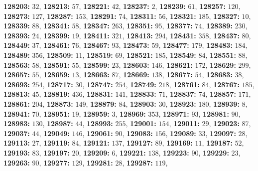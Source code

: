\textsf{\bfseries 128203:} $32$, \textsf{\bfseries 128213:} $57$, \textsf{\bfseries 128221:} $42$, \textsf{\bfseries 128237:} $2$, \textsf{\bfseries 128239:} $61$, \textsf{\bfseries 128257:} $120$, \textsf{\bfseries 128273:} $127$, \textsf{\bfseries 128287:} $153$, \textsf{\bfseries 128291:} $74$, \textsf{\bfseries 128311:} $56$, \textsf{\bfseries 128321:} $185$, \textsf{\bfseries 128327:} $10$, \textsf{\bfseries 128339:} $88$, \textsf{\bfseries 128341:} $58$, \textsf{\bfseries 128347:} $263$, \textsf{\bfseries 128351:} $95$, \textsf{\bfseries 128377:} $74$, \textsf{\bfseries 128389:} $230$, \textsf{\bfseries 128393:} $24$, \textsf{\bfseries 128399:} $19$, \textsf{\bfseries 128411:} $321$, \textsf{\bfseries 128413:} $294$, \textsf{\bfseries 128431:} $358$, \textsf{\bfseries 128437:} $80$, \textsf{\bfseries 128449:} $37$, \textsf{\bfseries 128461:} $76$, \textsf{\bfseries 128467:} $93$, \textsf{\bfseries 128473:} $59$, \textsf{\bfseries 128477:} $179$, \textsf{\bfseries 128483:} $184$, \textsf{\bfseries 128489:} $356$, \textsf{\bfseries 128509:} $11$, \textsf{\bfseries 128519:} $69$, \textsf{\bfseries 128521:} $185$, \textsf{\bfseries 128549:} $84$, \textsf{\bfseries 128551:} $88$, \textsf{\bfseries 128563:} $58$, \textsf{\bfseries 128591:} $55$, \textsf{\bfseries 128599:} $23$, \textsf{\bfseries 128603:} $146$, \textsf{\bfseries 128621:} $172$, \textsf{\bfseries 128629:} $299$, \textsf{\bfseries 128657:} $55$, \textsf{\bfseries 128659:} $13$, \textsf{\bfseries 128663:} $87$, \textsf{\bfseries 128669:} $138$, \textsf{\bfseries 128677:} $54$, \textsf{\bfseries 128683:} $38$, \textsf{\bfseries 128693:} $254$, \textsf{\bfseries 128717:} $30$, \textsf{\bfseries 128747:} $254$, \textsf{\bfseries 128749:} $218$, \textsf{\bfseries 128761:} $84$, \textsf{\bfseries 128767:} $185$, \textsf{\bfseries 128813:} $45$, \textsf{\bfseries 128819:} $436$, \textsf{\bfseries 128831:} $141$, \textsf{\bfseries 128833:} $71$, \textsf{\bfseries 128837:} $74$, \textsf{\bfseries 128857:} $171$, \textsf{\bfseries 128861:} $204$, \textsf{\bfseries 128873:} $149$, \textsf{\bfseries 128879:} $84$, \textsf{\bfseries 128903:} $30$, \textsf{\bfseries 128923:} $180$, \textsf{\bfseries 128939:} $8$, \textsf{\bfseries 128941:} $70$, \textsf{\bfseries 128951:} $19$, \textsf{\bfseries 128959:} $3$, \textsf{\bfseries 128969:} $353$, \textsf{\bfseries 128971:} $93$, \textsf{\bfseries 128981:} $90$, \textsf{\bfseries 128983:} $130$, \textsf{\bfseries 128987:} $44$, \textsf{\bfseries 128993:} $255$, \textsf{\bfseries 129001:} $154$, \textsf{\bfseries 129011:} $29$, \textsf{\bfseries 129023:} $87$, \textsf{\bfseries 129037:} $44$, \textsf{\bfseries 129049:} $146$, \textsf{\bfseries 129061:} $90$, \textsf{\bfseries 129083:} $156$, \textsf{\bfseries 129089:} $33$, \textsf{\bfseries 129097:} $28$, \textsf{\bfseries 129113:} $27$, \textsf{\bfseries 129119:} $84$, \textsf{\bfseries 129121:} $137$, \textsf{\bfseries 129127:} $89$, \textsf{\bfseries 129169:} $11$, \textsf{\bfseries 129187:} $52$, \textsf{\bfseries 129193:} $83$, \textsf{\bfseries 129197:} $20$, \textsf{\bfseries 129209:} $6$, \textsf{\bfseries 129221:} $138$, \textsf{\bfseries 129223:} $90$, \textsf{\bfseries 129229:} $23$, \textsf{\bfseries 129263:} $90$, \textsf{\bfseries 129277:} $129$, \textsf{\bfseries 129281:} $28$, \textsf{\bfseries 129287:} $119$, 
